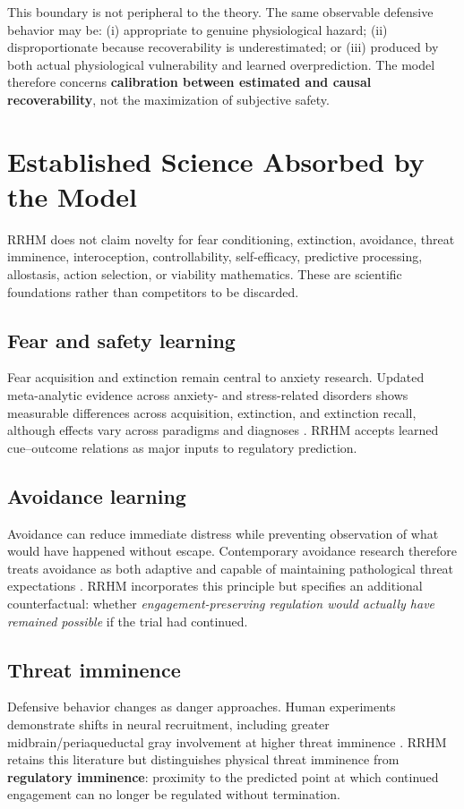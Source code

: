 \documentclass[11pt]{article}
\begin{document}
This boundary is not peripheral to the theory. The same observable defensive behavior may be: (i) appropriate to genuine physiological hazard; (ii) disproportionate because recoverability is underestimated; or (iii) produced by both actual physiological vulnerability and learned overprediction. The model therefore concerns \textbf{calibration between estimated and causal recoverability}, not the maximization of subjective safety.

\section{Established Science Absorbed by the Model}

RRHM does not claim novelty for fear conditioning, extinction, avoidance, threat imminence, interoception, controllability, self-efficacy, predictive processing, allostasis, action selection, or viability mathematics. These are scientific foundations rather than competitors to be discarded.

\subsection{Fear and safety learning}
Fear acquisition and extinction remain central to anxiety research. Updated meta-analytic evidence across anxiety- and stress-related disorders shows measurable differences across acquisition, extinction, and extinction recall, although effects vary across paradigms and diagnoses \cite{kausche2025}. RRHM accepts learned cue--outcome relations as major inputs to regulatory prediction.

\subsection{Avoidance learning}
Avoidance can reduce immediate distress while preventing observation of what would have happened without escape. Contemporary avoidance research therefore treats avoidance as both adaptive and capable of maintaining pathological threat expectations \cite{krypotos2015,pittig2018}. RRHM incorporates this principle but specifies an additional counterfactual: whether \emph{engagement-preserving regulation would actually have remained possible} if the trial had continued.

\subsection{Threat imminence}
Defensive behavior changes as danger approaches. Human experiments demonstrate shifts in neural recruitment, including greater midbrain/periaqueductal gray involvement at higher threat imminence \cite{mobbs2007}. RRHM retains this literature but distinguishes physical threat imminence from \textbf{regulatory imminence}: proximity to the predicted point at which continued engagement can no longer be regulated without termination.
\end{document}
